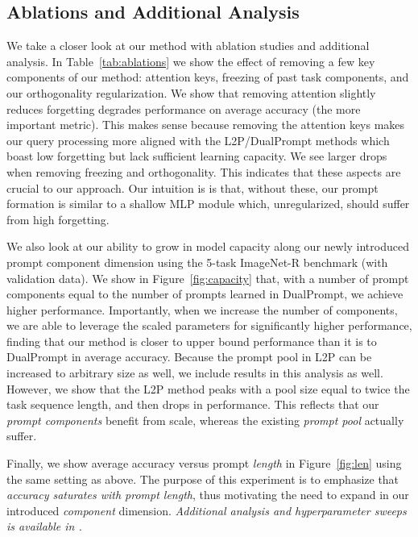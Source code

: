 \subsection{Ablations and Additional Analysis}

\label{section:exp_ablations_analysis}

We take a closer look at our method with ablation studies and additional analysis. In Table~\ref{tab:ablations} we show the effect of removing a few key components of our method: attention keys, freezing of past task components, and our orthogonality regularization. We show that removing attention slightly reduces forgetting degrades performance on average accuracy (the more important metric). This makes sense because removing the attention keys makes our query processing more aligned with the L2P/DualPrompt methods which boast low forgetting but lack sufficient learning capacity. We see larger drops when removing freezing and orthogonality. This indicates that these aspects are crucial to our approach. Our intuition is is that, without these, our prompt formation is similar to a shallow MLP module which, unregularized, should suffer from high forgetting.



We also look at our ability to grow in model capacity along our newly introduced prompt component dimension using the 5-task ImageNet-R benchmark (with validation data). We show in Figure~\ref{fig:capacity} that, with a number of prompt components equal to the number of prompts learned in DualPrompt, we achieve higher performance. Importantly, when we increase the number of components, we are able to leverage the scaled parameters for significantly higher performance, finding that our method is closer to upper bound performance than it is to DualPrompt in average accuracy. Because the prompt pool in L2P can be increased to arbitrary size as well, we include results in this analysis as well. However, we show that the L2P method peaks with a pool size equal to twice the task sequence length, and then drops in performance. This reflects that our \emph{prompt components} benefit from scale, whereas the existing \emph{prompt pool} actually suffer. 

Finally, we show average accuracy versus prompt \emph{length} in Figure~\ref{fig:len} using the same setting as above. The purpose of this experiment is to emphasize that \emph{accuracy saturates with prompt length}, thus motivating the need to expand in our introduced \emph{component} dimension.
\emph{Additional analysis and hyperparameter sweeps is available in \SMf{}.}
